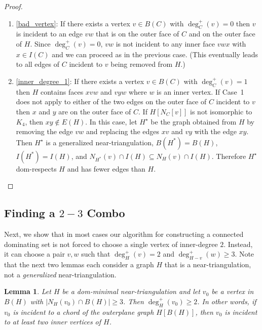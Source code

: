 \documentclass[a4paper,UKenglish, cleveref, autoref, thm-restate]{lipics-v2021}
\newtheorem{lem}{Lemma}
\begin{document}
\begin{proof}
\begin{enumerate}
    \item \cref{bad_vertex}: If there exists a vertex $v\in B(C)$ with $\deg^+_C(v)=0$ then $v$ is incident to an edge $vw$ that is on the outer face of $C$ and on the outer face of $H$. Since $\deg^+_C(v)=0$, $vw$ is not incident to any inner face $vwx$ with $x\in I(C)$ and we can proceed as in the previous case.  (This eventually leads to all edges of $C$ incident to $v$ being removed from $H$.)

    \item \cref{inner_degree_1}: If there exists a vertex $v\in B(C)$ with $\deg^+_C(v)=1$ then $H$ contains faces $xvw$ and $vyw$ where $w$ is an inner vertex.  If Case~1 does not apply to either of the two edges on the outer face of $C$ incident to $v$ then $x$ and $y$ are on the outer face of $C$. If $H[N_C[v]]$ is not isomorphic to $K_4$, then $xy\not\in E(H)$.  In this case, let $H^\star$ be the graph obtained from $H$ by removing the edge $vw$ and replacing the edges $xv$ and $vy$ with the edge $xy$. Then $H^\star$ is a generalized near-triangulation, $B(H^*)=B(H)$, $I(H^*)=I(H)$, and $N_{H^*}(v)\cap I(H)\subseteq N_{H}(v)\cap I(H)$.  Therefore $H^\star$ dom-respects $H$ and has fewer edges than $H$. \qedhere
  \end{enumerate}
\end{proof}

\subsection{Finding a $2-3$ Combo}
\label{combo}

Next, we show that in most cases our algorithm for constructing a connected dominating set is not forced to choose a single vertex of inner-degree $2$. Instead, it can choose a pair $v,w$ such that $\deg^+_H(v)=2$ and $\deg^+_{H-v}(w)\ge 3$. Note that the next two lemmas each consider a graph $H$ that is a near-triangulation, not a \emph{generalized} near-triangulation.

\begin{lem}\label{chord_incident}
  Let $H$ be a dom-minimal near-triangulation and let $v_0$ be a vertex in $B(H)$ with $|N_H(v_0)\cap B(H)|\ge 3$.  Then $\deg^+_H(v_0)\ge 2$.  In other words, if $v_0$ is incident to a chord of the outerplane graph $H[B(H)]$, then $v_0$ is incident to at least two inner vertices of $H$.
\end{lem}
\end{document}
